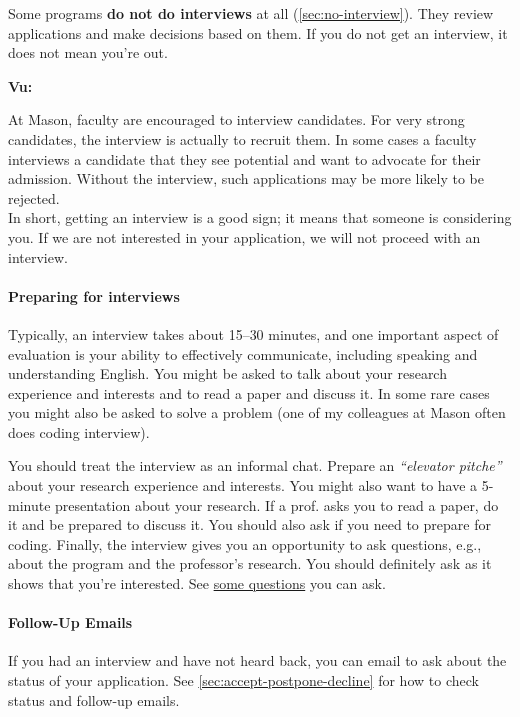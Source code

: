 \documentclass[oneside,11pt,dvipsnames]{book}
\newenvironment{commentbox}[1][]{
  \small
  \begin{mybox}
    {\small \textbf{#1}}
  }{
  \end{mybox}
}
\begin{document}
Some programs \textbf{do not do interviews} at all (\autoref{sec:no-interview}). They review applications and make decisions based on them.  If you do not get an interview, it does not mean you're out.

\begin{commentbox}[Vu:]
    At Mason, faculty are encouraged to interview candidates. For very strong candidates, the interview is actually to recruit them.  In some cases a faculty interviews a candidate that they see potential and want to advocate for their admission. Without the interview, such applications may be more likely to be rejected.\\
    
    In short, getting an interview is a good sign; it means that someone is considering you. If we are not interested in your application, we will not proceed with an interview.
\end{commentbox}

\paragraph{Preparing for interviews} Typically, an interview takes about 15--30 minutes, and one important aspect of evaluation is your ability to effectively communicate, including speaking and understanding English. 
You might be asked to talk about your research experience and interests and to read a paper and discuss it. In some rare cases you might also be asked to solve a problem (one of my colleagues at Mason often does coding interview).


You should treat the interview as an informal chat. Prepare an \emph{``elevator pitche''} about your research experience and interests. You might also want to have a 5-minute presentation about your research. If a prof. asks you to read a paper, do it and be prepared to discuss it. You should also ask if you need to prepare for coding. Finally, the interview gives you an opportunity to ask questions, e.g., about the program and the professor's research.  You should definitely ask as it shows that you're interested.  See \href{https://github.com/dynaroars/dynaroars.github.io/wiki/Answers-to-Ph.D-Advisor-Guide}{some questions} you can ask.



\paragraph{Follow-Up Emails} If you had an interview and have not heard back, you can email to ask about the status of your application. See \autoref{sec:accept-postpone-decline} for how to check status and follow-up emails.
\end{document}
